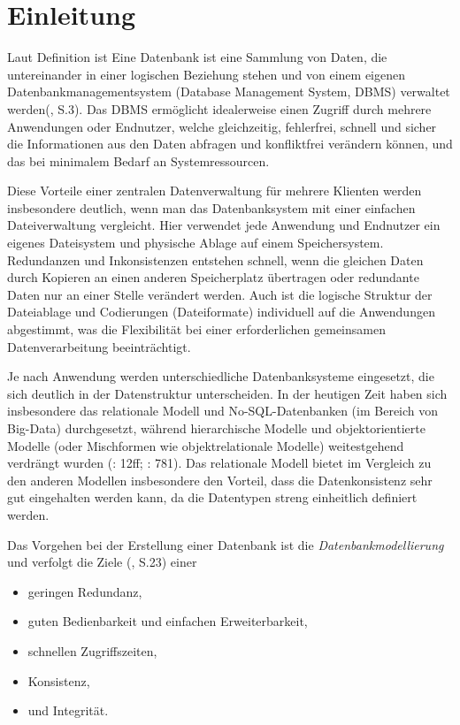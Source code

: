\section{Einleitung}
\label{sec:Einleitung}
Laut Definition ist \glqq Eine Datenbank ist eine Sammlung von Daten, die untereinander in einer logischen Beziehung stehen und von einem eigenen Datenbankmanagementsystem (Database Management System, DBMS) verwaltet werden\grqq (\cite{kaufmannSQLNoSQLDatenbanken92023}, S.3). Das DBMS ermöglicht idealerweise einen Zugriff durch mehrere Anwendungen oder Endnutzer, welche gleichzeitig, fehlerfrei, schnell und sicher die Informationen aus den Daten abfragen und konfliktfrei verändern können, und das bei minimalem Bedarf an Systemressourcen.

Diese Vorteile einer zentralen Datenverwaltung für mehrere Klienten werden insbesondere deutlich, wenn man das Datenbanksystem mit einer einfachen Dateiverwaltung vergleicht. Hier verwendet jede Anwendung und Endnutzer ein eigenes Dateisystem und physische Ablage auf einem Speichersystem. Redundanzen und Inkonsistenzen entstehen schnell, wenn die gleichen Daten durch Kopieren an einen anderen Speicherplatz übertragen oder redundante Daten nur an einer Stelle verändert werden. Auch ist die logische Struktur der Dateiablage und Codierungen (Dateiformate) individuell auf die Anwendungen abgestimmt, was die Flexibilität bei einer erforderlichen gemeinsamen Datenverarbeitung beeinträchtigt.

Je nach Anwendung werden unterschiedliche Datenbanksysteme eingesetzt, die sich deutlich in der Datenstruktur unterscheiden. In der heutigen Zeit haben sich insbesondere das relationale Modell und No-SQL-Datenbanken (im Bereich von Big-Data) durchgesetzt, während hierarchische Modelle und objektorientierte Modelle (oder Mischformen wie objektrelationale Modelle) weitestgehend verdrängt wurden (\cite{kaufmannSQLNoSQLDatenbanken92023}: 12ff; \cite{gehringWirtschaftsinformatik2022}: 781). Das relationale Modell bietet im Vergleich zu den anderen Modellen insbesondere den Vorteil, dass die Datenkonsistenz sehr gut eingehalten werden kann, da die Datentypen streng einheitlich definiert werden.

Das Vorgehen bei der Erstellung einer Datenbank ist die \textit{Datenbankmodellierung} und verfolgt die Ziele (\cite{schickerDatenbankenUndSQL2025}, S.23) einer
\begin{itemize}[itemsep=3pt]
	\item{geringen Redundanz,} 
	\item{guten Bedienbarkeit und einfachen Erweiterbarkeit,} 
	\item{schnellen Zugriffszeiten,} 
	\item{Konsistenz,}
	\item{und Integrität.}
\end{itemize}

